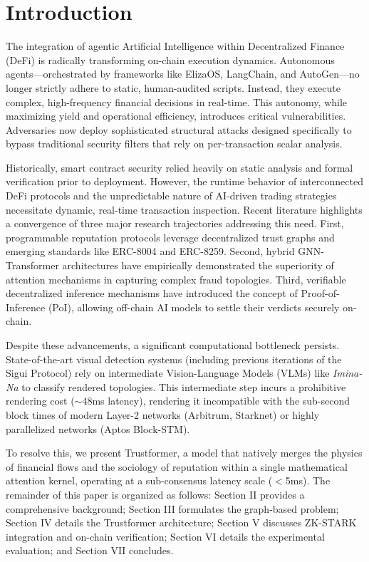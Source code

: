 \documentclass[conference,10pt]{IEEEtran}
\begin{document}
\section{Introduction}
The integration of agentic Artificial Intelligence within Decentralized Finance (DeFi) is radically transforming on-chain execution dynamics. Autonomous agents---orchestrated by frameworks like ElizaOS, LangChain, and AutoGen---no longer strictly adhere to static, human-audited scripts. Instead, they execute complex, high-frequency financial decisions in real-time. This autonomy, while maximizing yield and operational efficiency, introduces critical vulnerabilities. Adversaries now deploy sophisticated structural attacks designed specifically to bypass traditional security filters that rely on per-transaction scalar analysis.

Historically, smart contract security relied heavily on static analysis and formal verification prior to deployment. However, the runtime behavior of interconnected DeFi protocols and the unpredictable nature of AI-driven trading strategies necessitate dynamic, real-time transaction inspection. Recent literature highlights a convergence of three major research trajectories addressing this need. First, programmable reputation protocols leverage decentralized trust graphs and emerging standards like ERC-8004 and ERC-8259. Second, hybrid GNN-Transformer architectures have empirically demonstrated the superiority of attention mechanisms in capturing complex fraud topologies. Third, verifiable decentralized inference mechanisms have introduced the concept of Proof-of-Inference (PoI), allowing off-chain AI models to settle their verdicts securely on-chain.

Despite these advancements, a significant computational bottleneck persists. State-of-the-art visual detection systems (including previous iterations of the Sigui Protocol) rely on intermediate Vision-Language Models (VLMs) like \textit{Imina-Na} to classify rendered topologies. This intermediate step incurs a prohibitive rendering cost ($\sim$48ms latency), rendering it incompatible with the sub-second block times of modern Layer-2 networks (Arbitrum, Starknet) or highly parallelized networks (Aptos Block-STM).

To resolve this, we present Trustformer, a model that natively merges the physics of financial flows and the sociology of reputation within a single mathematical attention kernel, operating at a sub-consensus latency scale ($<$5ms). The remainder of this paper is organized as follows: Section II provides a comprehensive background; Section III formulates the graph-based problem; Section IV details the Trustformer architecture; Section V discusses ZK-STARK integration and on-chain verification; Section VI details the experimental evaluation; and Section VII concludes.
\end{document}
